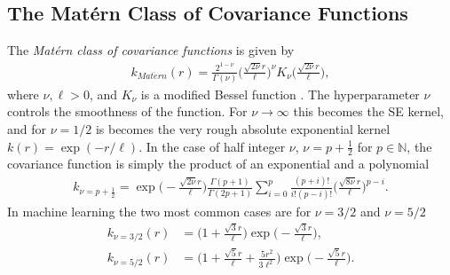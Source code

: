 \documentclass[twoside,english]{uiofysmaster}
\begin{document}
\subsection{The Mat\'{e}rn Class of Covariance Functions}\label{Sec:: gaussian process : Matern Class of Covariance Functions}

The \textit{Mat\'{e}rn class of covariance functions} is given by
\begin{align}\label{Eq:: gaussian process : Matern class of covariance functions}
k_{Mat\acute{e}rn} (r) = \frac{2^{1- \nu}}{\Gamma (\nu)} \Big( \frac{\sqrt{2 \nu} r	}{\ell} \Big)^{\nu} K_{\nu} \Big( \frac{\sqrt{2 \nu}r}{\ell} \Big),
\end{align}
where $\nu, \ell > 0$, and $K_{\nu}$ is a modified Bessel function \cite{abramowitz1964handbook}. The hyperparameter $\nu$ controls the smoothness of the function. For $\nu \rightarrow \infty$ this becomes the SE kernel, and for $\nu = 1/2$ is becomes the very rough absolute exponential kernel $k(r) = \exp (-r/\ell)$. In the case of half integer $\nu$, $\nu = p + \frac{1}{2}$ for $p \in \mathbb{N}$, the covariance function is simply the product of an exponential and a polynomial
\begin{align}
k_{\nu=p+\frac{1}{2}} = \exp \Big(- \frac{\sqrt{2 \nu} r	}{\ell} \Big) \frac{\Gamma(p+1)}{\Gamma(2p + 1)} \sum^p_{i=0} \frac{(p+i)!}{i!(p-i)!} \Big( \frac{\sqrt{8 \nu} r	}{\ell} \Big)^{p-i}.
\end{align}
In machine learning the two most common cases are for $\nu = 3/2$ and $\nu = 5/2$
\begin{align}
k_{\nu = 3/2}(r) &=  \Big(1 + \frac{\sqrt{3}r}{\ell} \Big) \exp \Big( -\frac{\sqrt{3}r}{\ell} \Big),\\
k_{\nu = 5/2}(r) &=  \Big(1 + \frac{\sqrt{5}r}{\ell}  + \frac{5r^2}{3 \ell^2}\Big) \exp \Big( -\frac{\sqrt{5}r}{\ell} \Big).
\end{align}

\end{document}
